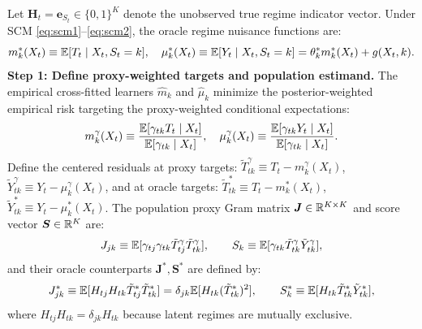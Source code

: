 Let $\boldsymbol{H}_t = \boldsymbol{e}_{S_t} \in \{0, 1\}^K$ denote the unobserved true regime indicator vector.
Under SCM \eqref{eq:scm1}--\eqref{eq:scm2}, the oracle regime nuisance functions are:
\begin{equation}
    m_k^*(X_t) \equiv \mathbb{E}[T_t \mid X_t, S_t = k], \quad \mu_k^*(X_t) \equiv \mathbb{E}[Y_t \mid X_t, S_t = k] = \theta_k^* m_k^*(X_t) + g(X_t, k).
\end{equation}
\textbf{Step 1: Define proxy-weighted targets and population estimand.}
The empirical cross-fitted learners $\hat{m}_k$ and $\hat{\mu}_k$ minimize the posterior-weighted empirical risk targeting the proxy-weighted conditional expectations:
\begin{equation}
    m_k^\gamma(X_t) \equiv \frac{\mathbb{E}[\gamma_{tk} T_t \mid X_t]}{\mathbb{E}[\gamma_{tk} \mid X_t]}, \quad \mu_k^\gamma(X_t) \equiv \frac{\mathbb{E}[\gamma_{tk} Y_t \mid X_t]}{\mathbb{E}[\gamma_{tk} \mid X_t]}.
\end{equation}
Define the centered residuals at proxy targets: $\tilde{T}_{tk}^\gamma \equiv T_t - m_k^\gamma(X_t)$, $\tilde{Y}_{tk}^\gamma \equiv Y_t - \mu_k^\gamma(X_t)$, and at oracle targets: $\tilde{T}_{tk}^* \equiv T_t - m_k^*(X_t)$, $\tilde{Y}_{tk}^* \equiv Y_t - \mu_k^*(X_t)$.
The population proxy Gram matrix $\boldsymbol{J} \in \mathbb{R}^{K \times K}$ and score vector $\boldsymbol{S} \in \mathbb{R}^K$ are:
\begin{equation}
    J_{jk} \equiv \mathbb{E}[\gamma_{tj}\gamma_{tk} \tilde{T}_{tj}^\gamma \tilde{T}_{tk}^\gamma], \qquad S_k \equiv \mathbb{E}[\gamma_{tk} \tilde{T}_{tk}^\gamma \tilde{Y}_{tk}^\gamma],
\end{equation}
and their oracle counterparts $\boldsymbol{J}^*, \boldsymbol{S}^*$ are defined by:
\begin{equation}
    J_{jk}^* \equiv \mathbb{E}[H_{tj} H_{tk} \tilde{T}_{tj}^* \tilde{T}_{tk}^*] = \delta_{jk} \mathbb{E}[H_{tk} (\tilde{T}_{tk}^*)^2], \qquad S_k^* \equiv \mathbb{E}[H_{tk} \tilde{T}_{tk}^* \tilde{Y}_{tk}^*],
\end{equation}
where $H_{tj} H_{tk} = \delta_{jk} H_{tk}$ because latent regimes are mutually exclusive.

